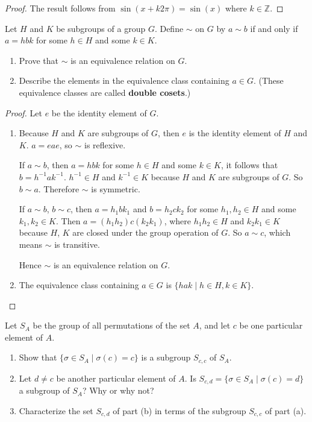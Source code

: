 \begin{proof}
    The result follows from $\sin(x + k2\pi) = \sin(x)$ where $k\in\mathbb{Z}$.
\end{proof}

\begin{exercise}
    Let $H$ and $K$ be subgroups of a group $G$. Define $\sim$ on $G$ by $a\sim b$ if and only if $a = hbk$ for some $h\in H$ and some $k\in K$.
    \begin{enumerate}[label={\textbf{\alph*.}}]
        \item Prove that $\sim$ is an equivalence relation on $G$.
        \item Describe the elements in the equivalence class containing $a\in G$. (These equivalence classes are called \textbf{double cosets}.)
    \end{enumerate}
\end{exercise}

\begin{proof}
    Let $e$ be the identity element of $G$.
    \begin{enumerate}[label={\textbf{\alph*.}}]
        \item Because $H$ and $K$ are subgroups of $G$, then $e$ is the identity element of $H$ and $K$. $a = eae$, so $\sim$ is reflexive.

              If $a\sim b$, then $a = hbk$ for some $h\in H$ and some $k\in K$, it follows that $b = h^{-1}ak^{-1}$. $h^{-1}\in H$ and $k^{-1}\in K$ because $H$ and $K$ are subgroups of $G$. So $b\sim a$. Therefore $\sim$ is symmetric.

              If $a\sim b$, $b\sim c$, then $a = h_{1}bk_{1}$ and $b = h_{2}ck_{2}$ for some $h_{1}, h_{2}\in H$ and some $k_{1}, k_{2}\in K$. Then $a = (h_{1}h_{2})c(k_{2}k_{1})$, where $h_{1}h_{2}\in H$ and $k_{2}k_{1}\in K$ because $H$, $K$ are closed under the group operation of $G$. So $a\sim c$, which means $\sim$ is transitive.

              Hence $\sim$ is an equivalence relation on $G$.
        \item The equivalence class containing $a\in G$ is $\{ hak \mid h\in H, k\in K \}$.
    \end{enumerate}
\end{proof}

\begin{exercise}
    Let $S_{A}$ be the group of all permutations of the set $A$, and let $c$ be one particular element of $A$.
    \begin{enumerate}[label={\textbf{\alph*.}}]
        \item Show that $\{ \sigma\in S_{A} \mid \sigma(c) = c \}$ is a subgroup $S_{c,c}$ of $S_{A}$.
        \item Let $d\ne c$ be another particular element of $A$. Is $S_{c,d} = \{ \sigma\in S_{A} \mid \sigma(c) = d \}$ a subgroup of $S_{A}$? Why or why not?
        \item Characterize the set $S_{c,d}$ of part (b) in terms of the subgroup $S_{c,c}$ of part (a).
    \end{enumerate}
\end{exercise}

